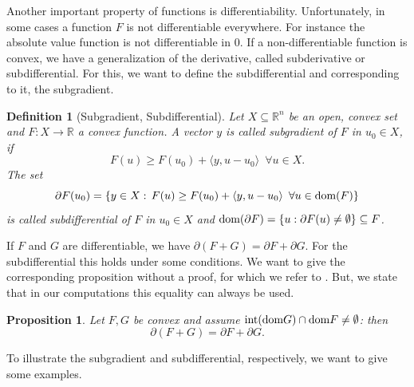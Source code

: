 \documentclass[abstracton]{scrreprt}
\newtheorem{proposition}[theorem]{Proposition}
\newtheorem{definition}[theorem]{Definition}
\begin{document}
        Another important property of functions is differentiability. Unfortunately, in some cases a function $F$ is not differentiable everywhere. For instance the absolute value function is not differentiable in $0$. If a non-differentiable function is convex, we have a generalization of the derivative, called subderivative or subdifferential. For this, we want to define the subdifferential and corresponding to it, the subgradient.
        \begin{definition}[Subgradient, Subdifferential] %
        \label{def:subgradient_subdifferential}
            Let $X \subseteq \mathbb{R}^{n}$ be an open, convex set and $F: X \longrightarrow \mathbb{R}$ a convex function. A vector $y$ is called subgradient of $F$ in $u_{0} \in X$, if
                \begin{equation}
                    F(u) \ge F(u_{0}) + \langle y, u - u_{0} \rangle \,\,\, \forall u \in X.
                \label{eq:subgradient}
                \end{equation}
            The set
                $$
                    \partial F(u_{0}) = \{ y \in X: \, F(u) \ge F(u_{0}) + \langle y, u - u_{0} \rangle \,\,\, \forall u \in \textnormal{dom}(F) \}
                $$
            is called subdifferential of $F$ in $u_{0} \in X$ and $\textnormal{dom}(\partial F) = \{ u: \partial F(u) \ne \emptyset \} \subseteq F$.
        \end{definition}
        If $F$ and $G$ are differentiable, we have $\partial(F + G) = \partial F + \partial G$. For the subdifferential this holds under some conditions. We want to give the corresponding proposition without a proof, for which we refer to \cite{Rockafellar}. But, we state that in our computations this equality can always be used.
        \begin{proposition} %
            Let $F, G$ be convex and assume $\textnormal{int} (\textnormal{dom} G) \cap \textnormal{dom} F \ne \emptyset$: then
                $$
                    \partial(F + G) = \partial F + \partial G.
                $$
        \end{proposition}
        To illustrate the subgradient and subdifferential, respectively, we want to give some examples.
\end{document}
